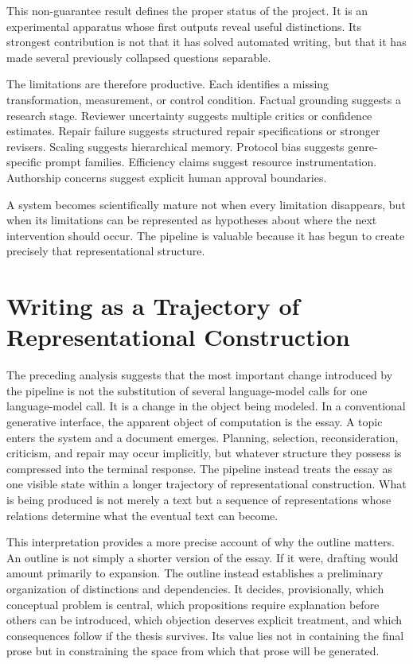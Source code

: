 \documentclass[11pt]{article}
\begin{document}
This non-guarantee result defines the proper status of the project. It is an experimental apparatus whose first outputs reveal useful distinctions. Its strongest contribution is not that it has solved automated writing, but that it has made several previously collapsed questions separable.

The limitations are therefore productive. Each identifies a missing transformation, measurement, or control condition. Factual grounding suggests a research stage. Reviewer uncertainty suggests multiple critics or confidence estimates. Repair failure suggests structured repair specifications or stronger revisers. Scaling suggests hierarchical memory. Protocol bias suggests genre-specific prompt families. Efficiency claims suggest resource instrumentation. Authorship concerns suggest explicit human approval boundaries.

A system becomes scientifically mature not when every limitation disappears, but when its limitations can be represented as hypotheses about where the next intervention should occur. The pipeline is valuable because it has begun to create precisely that representational structure.

\section{Writing as a Trajectory of Representational Construction}

The preceding analysis suggests that the most important change introduced by the pipeline is not the substitution of several language-model calls for one language-model call. It is a change in the object being modeled. In a conventional generative interface, the apparent object of computation is the essay. A topic enters the system and a document emerges. Planning, selection, reconsideration, criticism, and repair may occur implicitly, but whatever structure they possess is compressed into the terminal response. The pipeline instead treats the essay as one visible state within a longer trajectory of representational construction. What is being produced is not merely a text but a sequence of representations whose relations determine what the eventual text can become.

This interpretation provides a more precise account of why the outline matters. An outline is not simply a shorter version of the essay. If it were, drafting would amount primarily to expansion. The outline instead establishes a preliminary organization of distinctions and dependencies. It decides, provisionally, which conceptual problem is central, which propositions require explanation before others can be introduced, which objection deserves explicit treatment, and which consequences follow if the thesis survives. Its value lies not in containing the final prose but in constraining the space from which that prose will be generated.
\end{document}
